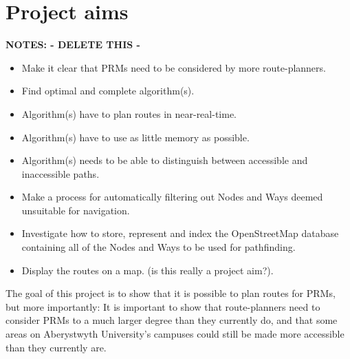 \section{Project aims}


\textbf{NOTES: - DELETE THIS -}
\begin{itemize}
	\item Make it clear that PRMs need to be considered by more route-planners.
\\
	\item Find optimal and complete algorithm(s).
	\item Algorithm(s) have to plan routes in near-real-time.
	\item Algorithm(s) have to use as little memory as possible.
	\item Algorithm(s) needs to be able to distinguish between accessible and inaccessible paths.
	\item Make a process for automatically filtering out Nodes and Ways deemed unsuitable for navigation.
\\
	\item Investigate how to store, represent and index the OpenStreetMap database containing all of the Nodes and Ways to be used for pathfinding.
	\item Display the routes on a map. (is this really a project aim?).
\end{itemize}

The goal of this project is to show that it is possible to plan routes for PRMs, but more importantly: It is important to show that route-planners need to consider PRMs to a much larger degree than they currently do, and that some areas on Aberystwyth University's campuses could still be made more accessible than they currently are.

